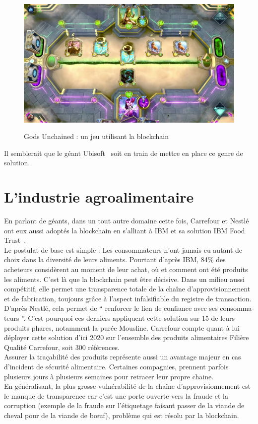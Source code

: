 \documentclass[12pt, a4paper, oneside]{book}
\begin{document}
    \begin{figure}[H]
        \begin{center}
          \includegraphics[width=.69\textwidth]{images/godsunchained.jpg}
          \label{fig:jeucartes}
          \caption{Gods Unchained : un jeu utilisant la blockchain}
        \end{center}
    \end{figure}

    Il semblerait que le géant Ubisoft~\cite{ubi} soit en train de mettre en place ce genre de solution.

    \section{L'industrie agroalimentaire}

    En parlant de géants, dans un tout autre domaine cette fois, Carrefour et Nestlé ont eux aussi adoptés la blockchain en s’alliant à IBM et sa solution IBM Food Trust~\cite{IBMfood}.
    \\
    Le postulat de base est simple : Les consommateurs n’ont jamais eu autant de choix dans la diversité de leurs aliments. Pourtant d’après IBM, 84\% des acheteurs considèrent au moment de leur achat, où et comment ont été produits les aliments. C’est là que la blockchain peut être décisive. Dans un milieu aussi compétitif, elle permet une transparence totale de la chaîne d’approvisionnement et de fabrication, toujours grâce à l’aspect infalsifiable du registre de transaction.
    \\
    D’après Nestlé, cela permet de \hyphenquote{french}{ renforcer le lien de confiance avec ses consommateurs }. C’est pourquoi ces derniers appliquent cette solution sur 15 de leurs produits phares, notamment la purée Mousline. Carrefour compte quant à lui déployer cette solution d’ici 2020 sur l’ensemble des produits alimentaires Filière Qualité Carrefour, soit 300 références.
    \\
    Assurer la traçabilité des produits représente aussi un avantage majeur en cas d’incident de sécurité alimentaire. Certaines compagnies, prennent parfois plusieurs jours à plusieurs semaines pour retracer leur propre chaine.
    \\
    En généralisant, la plus grosse vulnérabilité de la chaîne d’approvisionnement est le manque de transparence car c'est une porte ouverte vers la fraude et la corruption (exemple de la fraude sur l’étiquetage faisant passer de la viande de cheval pour de la viande de bœuf), problème qui est résolu par la blockchain.
\end{document}
